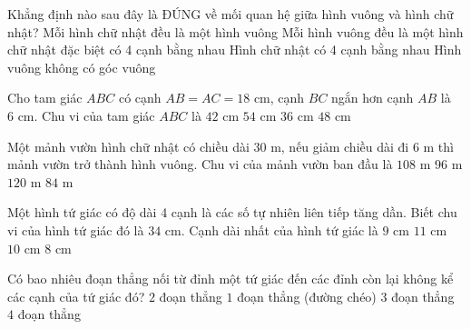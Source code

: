 \begin{ex} %
Khẳng định nào sau đây là ĐÚNG về mối quan hệ giữa hình vuông và hình chữ nhật?
\choice
{Mỗi hình chữ nhật đều là một hình vuông}
{\True Mỗi hình vuông đều là một hình chữ nhật đặc biệt có 4 cạnh bằng nhau}
{Hình chữ nhật có 4 cạnh bằng nhau}
{Hình vuông không có góc vuông}
\end{ex}

\begin{ex} %
Cho tam giác $ABC$ có cạnh $AB = AC = 18\text{ cm}$, cạnh $BC$ ngắn hơn cạnh $AB$ là $6\text{ cm}$. Chu vi của tam giác $ABC$ là
\choice
{$42\text{ cm}$}
{$54\text{ cm}$}
{$36\text{ cm}$}
{\True $48\text{ cm}$}
\end{ex}

\begin{ex} %
Một mảnh vườn hình chữ nhật có chiều dài $30\text{ m}$, nếu giảm chiều dài đi $6\text{ m}$ thì mảnh vườn trở thành hình vuông. Chu vi của mảnh vườn ban đầu là
\choice
{\True $108\text{ m}$}
{$96\text{ m}$}
{$120\text{ m}$}
{$84\text{ m}$}
\end{ex}

\begin{ex} %
Một hình tứ giác có độ dài 4 cạnh là các số tự nhiên liên tiếp tăng dần. Biết chu vi của hình tứ giác đó là $34\text{ cm}$. Cạnh dài nhất của hình tứ giác là
\choice
{$9\text{ cm}$}
{$11\text{ cm}$}
{\True $10\text{ cm}$}
{$8\text{ cm}$}
\end{ex}

\begin{ex} %
Có bao nhiêu đoạn thẳng nối từ đỉnh một tứ giác đến các đỉnh còn lại không kể các cạnh của tứ giác đó?
\choice
{$2$ đoạn thẳng}
{\True $1$ đoạn thẳng (đường chéo)}
{$3$ đoạn thẳng}
{$4$ đoạn thẳng}
\end{ex}

